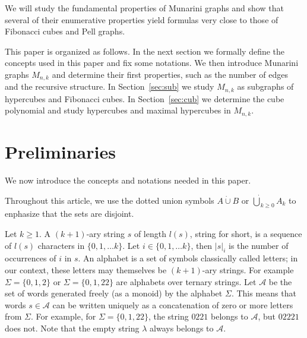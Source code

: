 \documentclass[11pt]{article}
\newcommand{\A}{{\mathcal A}}
\begin{document}
We will study the fundamental properties of Munarini graphs and show that several of their enumerative properties yield formulas very close  to those of Fibonacci cubes and Pell graphs.


This paper is organized as follows. In the next section we formally define the  concepts used in this paper and fix some notations. We then introduce Munarini graphs $M_{n,k}$ and determine their first properties, such as the number of edges and the recursive structure.  In Section~\ref{sec:sub} we study $M_{n,k}$ as subgraphs of hypercubes and Fibonacci cubes. In Section~\ref{sec:cub} we determine the cube polynomial and study hypercubes and maximal hypercubes in $M_{n,k}$. 




\section{Preliminaries}
\label{sec:basic}
We now introduce the concepts and notations needed in this paper.


Throughout this article, we use  the dotted union symbols $A\dot{\cup} B$ or $\dot{\bigcup}_{k\geq 0}{A_k}$ to enphasize that the sets are disjoint.

Let $k\geq 1$. A $(k+1)$-ary  string $s$ of length $l(s)$,  string for short,  is a sequence of $l(s)$ characters in $\{0,1,\ldots k\}$. Let $i\in\{0,1,\ldots k\}$, then $|s|_i$ is the number of occurrences of $i$ in $s$.
An alphabet is a set of symbols classically called letters; in our context, these letters may themselves be $(k+1)$-ary strings. For example $\Sigma=\{0,1,2\}$ or $\Sigma=\{0,1,22\}$ are alphabets over ternary strings. Let $\A$ be the set of words generated freely (as a monoid) by the alphabet $\Sigma$. This means that words $s \in \A$ can be written 
uniquely as a concatenation of zero or more letters from $\Sigma$. For example, for $\Sigma=\{0,1,22\}$, the string $0221$ belongs to $\A$, but $02221$ does not. Note that the empty string $\lambda$ always belongs to $\A$.
\end{document}
